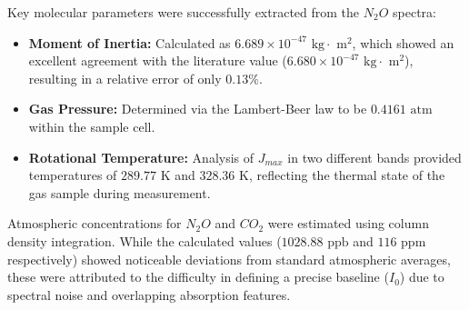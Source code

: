 Key molecular parameters were successfully extracted from the $N_2O$ spectra:
\begin{itemize}
    \item \textbf{Moment of Inertia:} Calculated as $6.689 \times 10^{-47} \text{ kg} \cdot \text{ m}^2$, which showed an excellent agreement with the literature value ($6.680 \times 10^{-47} \text{ kg} \cdot \text{ m}^2$), resulting in a relative error of only $0.13\%$.
    \item \textbf{Gas Pressure:} Determined via the Lambert-Beer law to be $0.4161 \text{ atm}$ within the sample cell.
    \item \textbf{Rotational Temperature:} Analysis of $J_{max}$ in two different bands provided temperatures of $289.77 \text{ K}$ and $328.36 \text{ K}$, reflecting the thermal state of the gas sample during measurement.
\end{itemize}

Atmospheric concentrations for $N_2O$ and $CO_2$ were estimated using column density integration. While the calculated values ($1028.88 \text{ ppb}$ and $116 \text{ ppm}$ respectively) showed noticeable deviations from standard atmospheric averages, these were attributed to the difficulty in defining a precise baseline ($I_0$) due to spectral noise and overlapping absorption features. 


